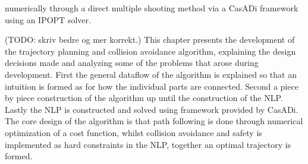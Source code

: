 numerically
through a direct multiple shooting method via a CasADi framework using an \gls{IPOPT} solver.
\fi

(TODO: skriv bedre og mer korrekt.)
This chapter presents the development of the trajectory planning and collision avoidance algorithm, explaining the design decisions made
and analyzing some of the problems that arose during development. First the general dataflow of the algorithm is explained so that
an intuition is formed as for how the individual parts are connected. Second a piece by piece construction of the algorithm up until
the construction of the \gls{NLP}. Lastly the \gls{NLP} is constructed and solved using framework provided by CasADi. The core design
of the algorithm is that path following is done through numerical optimization of a cost function, whilst collision avoidance and safety
is implemented as hard constraints in the \gls{NLP}, together an optimal trajectory is formed. 


